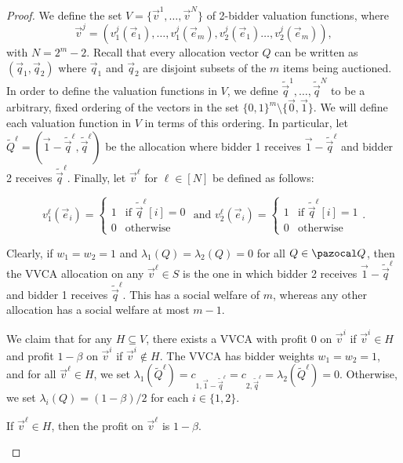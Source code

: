 \begin{proof}
We define the set $V = \{\vec{v}^1, \dots, \vec{v}^N\}$ of 2-bidder valuation functions, where \[\vec{v}^j = (v_1^j(\vec{e}_1), \dots, v_1^j(\vec{e}_m), v_2^j(\vec{e}_1) \dots, v_2^j(\vec{e}_m)),\] with $N = 2^m - 2$. Recall that every allocation vector $Q$ can be written as $\left(\vec{q}_1, \vec{q}_2\right)$ where $\vec{q}_1$ and $\vec{q}_2$ are disjoint subsets of the $m$ items being auctioned. In order to define the valuation functions in $V$, we define $\tilde{\vec{q}}^1, \dots, \tilde{\vec{q}}^N$ to be a arbitrary, fixed ordering of the vectors in the set $\{0,1\}^m \setminus \{\vec{0}, \vec{1}\}$. We will define each valuation function in $V$ in terms of this ordering. In particular, let $\tilde{Q}^\ell = \left(\vec{1} - \tilde{\vec{q}}^\ell, \tilde{\vec{q}}^\ell\right)$ be the allocation where bidder 1 receives $\vec{1} - \tilde{\vec{q}}^\ell$ and bidder 2 receives $\tilde{\vec{q}}^\ell$. Finally, let $\vec{v}^\ell$ for $\ell \in [N]$ be defined as follows:

\[v_1^\ell(\vec{e}_i) = \begin{cases} 1 &\text{if } \tilde{\vec{q}}^\ell[i] = 0\\
0 &\text{otherwise}
\end{cases} \text{ and } v_2^\ell(\vec{e}_i) = \begin{cases} 1 &\text{if } \tilde{\vec{q}}^\ell[i] = 1\\
0 &\text{otherwise}
\end{cases}.\]

Clearly, if $w_1=w_2=1$ and $\lambda_1(Q) = \lambda_2(Q) = 0$ for all $Q \in \Qset$, then the VVCA allocation on any $\vec{v}^\ell \in S$ is the one in which bidder 2 receives $\vec{1} - \tilde{\vec{q}}^\ell$ and bidder 1 receives $\tilde{\vec{q}}^\ell$. This has a social welfare of $m$, whereas any other allocation has a social welfare at most $m-1$.

We claim that for any $H \subseteq V$, there exists a VVCA with profit 0 on $\vec{v}^i$ if $\vec{v}^i \in H$ and profit $1-\beta$ on $\vec{v}^i$ if $\vec{v}^i \not\in H$. The VVCA has bidder weights $w_1 = w_2 = 1$, and for all $\vec{v}^\ell \in H$, we set $\lambda_1(\tilde{Q}^\ell) = c_{1,\vec{1} - \tilde{\vec{q}}^\ell} = c_{2, \tilde{\vec{q}}^\ell} = \lambda_2(\tilde{Q}^\ell) = 0$. Otherwise, we set $\lambda_i(Q) = (1 - \beta)/2$ for each $i \in \{1,2\}$.

\begin{lemma}\label{lem:VVCA_high} If $\vec{v}^\ell \in H$, then the profit on $\vec{v}^\ell$ is $1-\beta$.
\end{lemma}


\end{proof}
